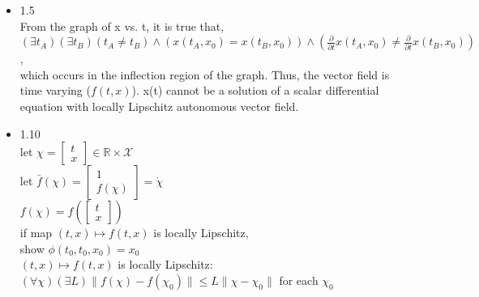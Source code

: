 \documentclass[12pt,letter]{article}
\newcommand{\R}{\mathbb{R}}
\begin{document}


\begin{itemize}
  
\item 1.5\\
  From the graph of x vs. t, it is true that, \\
  $(\exists t_A)(\exists t_B)(t_A\neq t_B) \wedge (x(t_A,x_0)=x(t_B,x_0)) \wedge (\frac{\partial}{\partial t}x(t_A,x_0) \neq \frac{\partial}{\partial t}x(t_B,x_0))$,\\
  which occurs in the inflection region of the graph. Thus, the vector field is time varying ($f(t,x)$). x(t) cannot be a solution of a scalar differential equation with locally Lipschitz autonomous vector field.
  
\item 1.10\\
  
  let $\chi=\begin{bmatrix}t \\ x\end{bmatrix} \in \R \times \mathcal{X}$\\

  let $\bar{f}(\chi)=\begin{bmatrix}1 \\ f(\chi)\end{bmatrix} = \dot{\chi}$\\

  $f(\chi)=f(\begin{bmatrix}t \\ x\end{bmatrix})$\\

  if map $(t,x)\mapsto f(t,x)$ is locally Lipschitz,\\
  show $\phi(t_0,t_0,x_0)=x_0$\\

  $(t,x)\mapsto f(t,x)$ is locally Lipschitz:\\
  $(\forall \chi)(\exists L)\|f(\chi)-f(\chi_0)\| \leq L \|\chi-\chi_0\|$ for each $\chi_0$\\
  

\end{itemize}
\end{document}

